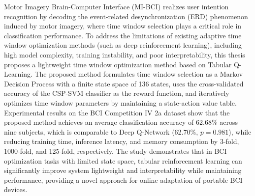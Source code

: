 
\begin{abstract}
运动想象脑机接口（Motor Imagery BCI）通过解码运动想象诱发的事件相关去同步化（Event-Related Desynchronization, ERD）现象实现用户意图识别，其中时间窗的选择对分类性能具有关键影响。针对现有自适应时间窗优化方法（如深度强化学习）存在的模型复杂度高、训练不稳定、可解释性差等问题，本文提出一种基于表格型 Q-Learning 的轻量化时间窗优化方法。该方法将时间窗选择建模为马尔可夫决策过程，定义包含 136 个状态的有限状态空间，以 CSP-SVM 分类器的交叉验证准确率作为奖励函数，通过维护状态 - 动作价值表迭代优化时间窗参数。在 BCI Competition IV 2a 数据集上的实验结果表明，所提方法在九名被试上的平均分类准确率为 62.68\%，与深度 Q 网络（62.70\%）相当（$p = 0.981$），但在训练时间、推理延迟和内存占用方面分别降低了 3 倍、1000 倍和 125 倍。研究表明，在状态空间有限的 BCI 优化任务中，表格型强化学习可在保证性能的同时显著提升系统轻量化与可解释性，为便携式 BCI 设备的在线自适应提供了新思路。

\end{abstract}

\begin{enabstract}
Motor Imagery Brain-Computer Interface (MI-BCI) realizes user intention recognition by decoding the event-related desynchronization (ERD) phenomenon induced by motor imagery, where time window selection plays a critical role in classification performance. To address the limitations of existing adaptive time window optimization methods (such as deep reinforcement learning), including high model complexity, training instability, and poor interpretability, this thesis proposes a lightweight time window optimization method based on Tabular Q-Learning. The proposed method formulates time window selection as a Markov Decision Process with a finite state space of 136 states, uses the cross-validated accuracy of the CSP-SVM classifier as the reward function, and iteratively optimizes time window parameters by maintaining a state-action value table. Experimental results on the BCI Competition IV 2a dataset show that the proposed method achieves an average classification accuracy of 62.68\% across nine subjects, which is comparable to Deep Q-Network (62.70\%, $p = 0.981$), while reducing training time, inference latency, and memory consumption by 3-fold, 1000-fold, and 125-fold, respectively. The study demonstrates that in BCI optimization tasks with limited state space, tabular reinforcement learning can significantly improve system lightweight and interpretability while maintaining performance, providing a novel approach for online adaptation of portable BCI devices.

\end{enabstract}
